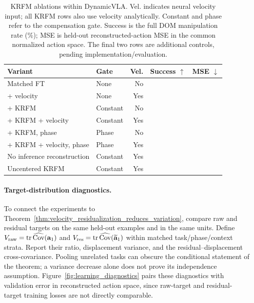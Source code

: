 \documentclass[10pt,twocolumn,letterpaper]{article}
\newcommand{\pending}{\phantom{00.00}}
\begin{document}
\begin{table}[t]
\centering
\caption{KRFM ablations within DynamicVLA. Vel. indicates neural velocity input;
all KRFM rows also use velocity analytically. Constant and phase refer to the
compensation gate. Success is the full DOM manipulation rate (\%); MSE is
held-out reconstructed-action MSE in the common normalized action space.
The final two rows are additional controls, pending implementation/evaluation.}
\label{tab:krfm_ablation}
\setlength{\tabcolsep}{3pt}
\scriptsize
\begin{tabular*}{\linewidth}{@{\extracolsep{\fill}}llrrr@{}}
\toprule
Variant & Gate & Vel. & Success $\uparrow$ & MSE $\downarrow$ \\
\midrule
Matched FT & None & No & \pending & \pending \\
+ velocity & None & Yes & \pending & \pending \\
+ KRFM & Constant & No & \pending & \pending \\
+ KRFM + velocity & Constant & Yes & \pending & \pending \\
+ KRFM, phase & Phase & No & \pending & \pending \\
+ KRFM + velocity, phase & Phase & Yes & \pending & \pending \\
\midrule
No inference reconstruction & Constant & Yes & \pending & \pending \\
Uncentered KRFM & Constant & Yes & \pending & \pending \\
\bottomrule
\end{tabular*}
\end{table}

\paragraph{Target-distribution diagnostics.}
To connect the experiments to
Theorem~\ref{thm:velocity_residualization_reduces_variation}, compare raw and
residual targets on the same held-out examples and in the same units. Define
$V_{\rm raw}=\operatorname{tr}\widehat{\operatorname{Cov}}(\mathbf a_1)$ and
$V_{\rm res}=\operatorname{tr}\widehat{\operatorname{Cov}}(\widetilde{\mathbf a}_1)$
within matched task/phase/context strata. Report their ratio, displacement
variance, and the residual--displacement cross-covariance. Pooling unrelated
tasks can obscure the conditional statement of the theorem; a variance decrease
alone does not prove its independence assumption. Figure~\ref{fig:learning_diagnostics}
pairs these diagnostics with validation error in reconstructed action space,
since raw-target and residual-target training losses are not directly comparable.
\end{document}

